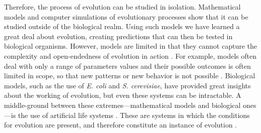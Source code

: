 \begin{doublespace}
Therefore, the process of evolution can be studied in isolation.
%
Mathematical models and computer simulations of evolutionary processes
show that it can be studied outside of the biological realm.
%
Using such models we have learned a great deal about evolution,
creating predictions that can then be tested in biological organisms.
%
However, models are limited in that they cannot capture
the complexity and open-endedness of evolution in action \citep{yed01}.
%
For example, models often deal with only a range of parameters values
and their possible outcomes is often limited in scope,
so that new patterns or new behavior is not possible \citep{yed01}.
%
Biological models, such as the use of \emph{E. coli} and \emph{S. cerevisiae},
have provided great insights about the working of evolution,
but even these systems can be intractable.
%
A middle-ground between these extremes---mathematical models
and biological ones---is the use of artificial life systems \citep{yed01}.
%
These are systems in which the conditions for evolution are present,
and therefore constitute an instance of evolution \citep{pen07}.



%


\end{doublespace}
